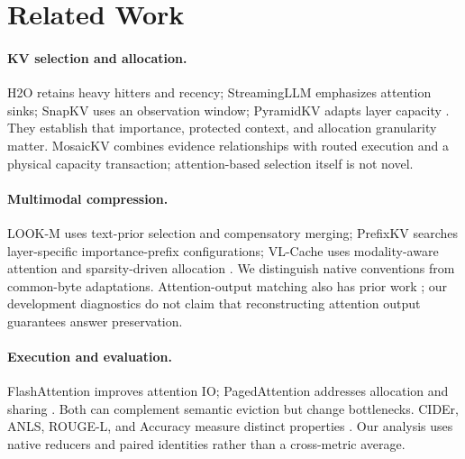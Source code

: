 \section{Related Work}
\paragraph{KV selection and allocation.}
H2O retains heavy hitters and recency; StreamingLLM emphasizes attention sinks;
SnapKV uses an observation window; PyramidKV adapts layer capacity
\citep{zhang2023h2o,xiao2024streaming,li2024snapkv,cai2024pyramidkv}.
They establish that importance, protected context, and allocation granularity
matter. MosaicKV combines evidence relationships with routed execution and a
physical capacity transaction; attention-based selection itself is not novel.

\paragraph{Multimodal compression.}
LOOK-M uses text-prior selection and compensatory merging; PrefixKV searches
layer-specific importance-prefix configurations; VL-Cache uses modality-aware
attention and sparsity-driven allocation
\citep{wan2024lookm,wang2025prefixkv,tu2025vlcache}. We distinguish native
conventions from common-byte adaptations. Attention-output matching also has
prior work \citep{attentionmatching2026}; our development diagnostics do not
claim that reconstructing attention output guarantees answer preservation.

\paragraph{Execution and evaluation.}
FlashAttention improves attention IO; PagedAttention addresses allocation and
sharing \citep{dao2022flash,dao2023flash2,kwon2023paged}. Both can complement
semantic eviction but change bottlenecks. CIDEr, ANLS, ROUGE-L, and Accuracy
measure distinct properties
\citep{vedantam2015cider,mathew2021docvqa,lin2004rouge,song2024milebench}.
Our analysis uses native reducers and paired identities rather than a
cross-metric average.
